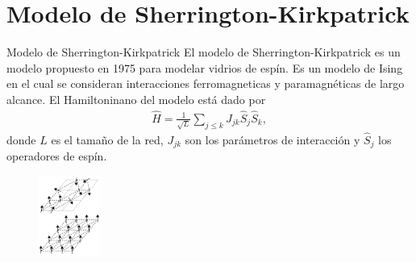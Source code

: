 \documentclass[xcolor=dvipsnames,presentation]{beamer}%
\newcommand{\shk}{Sherrington-Kirkpatrick}
\begin{document}
%

{
\AtBeginSection{}
\section{Modelo de \shk{}}
\begin{frame}{Modelo de \shk{}}
El modelo de \shk{} es un modelo propuesto en 1975 para modelar vidrios 
de espín. Es un modelo de Ising en el cual se consideran interacciones 
ferromagneticas y paramagnéticas de largo alcance. El Hamiltoninano 
del modelo está dado por 
\begin{align*}
\hat H=\frac{1}{\sqrt{L}}\sum_{j\leq k}J_{jk}\hat S_j\hat S_k,
\end{align*}
donde $L$ es el tamaño de la red, $J_{jk}$ son los parámetros de 
interacción y $\hat S_j$ los operadores de espín.

\begin{figure}
\includegraphics[width=2cm]{spin_glass}
\end{figure}
\end{frame}
}
\end{document}
